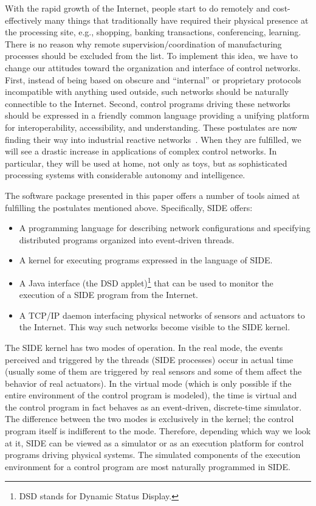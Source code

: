 With the rapid growth of the Internet, people start to do remotely and
cost-effectively many things that traditionally
have required their physical presence at the 
processing site, e.g., shopping, banking transactions, conferencing,
learning.
There is no reason why remote 
supervision/coordination of manufacturing processes should be excluded
from the list.
To implement this idea, 
we have to change our attitudes toward the organization and interface of
control networks.
First, instead of 
being based on obscure and ``internal'' or proprietary protocols
incompatible with anything used outside, such 
networks should be naturally connectible to the Internet.
Second, control programs driving these networks 
should be expressed in a friendly common language providing a unifying
platform for interoperability, 
accessibility, and understanding. These postulates are now finding their
way into industrial reactive networks~\cite{sti96}.
When they are fulfilled, we will see a drastic increase in
applications of complex control networks.
In particular, they will be used at home, not only as toys, but
as sophisticated processing systems with considerable autonomy and
intelligence.

The software package presented in this paper offers a number of tools aimed
at fulfilling the postulates mentioned above.
Specifically, SIDE offers:

\begin{itemize}
\item
A programming language for describing network configurations and specifying
distributed programs organized into event-driven threads.
\item
A kernel for executing programs expressed in the language of SIDE.
\item
A Java interface (the DSD applet)\footnote{DSD stands for
Dynamic Status Display.}
that can be used to monitor the execution of a SIDE
program from the Internet.
\item
A TCP/IP daemon interfacing physical networks of
sensors and actuators to the Internet.
This way such networks become visible to the SIDE kernel.
\end{itemize}

The SIDE kernel has two modes of operation.
In the real mode, the events perceived and triggered by the threads
(SIDE processes) occur in actual time (usually some of them are triggered
by real sensors and some of them affect the behavior of real actuators).
In the virtual mode (which is only possible if the entire environment of
the control program is modeled), the time is virtual and the control
program in fact behaves as an event-driven, discrete-time simulator.
The difference between the two modes is exclusively in the kernel;
the control program itself is indifferent to the mode.
Therefore, depending which way we look at it, SIDE can be viewed as
a simulator or as an execution platform for control programs driving
physical systems.
The simulated components of the execution environment for a control program
are most naturally programmed in SIDE.

